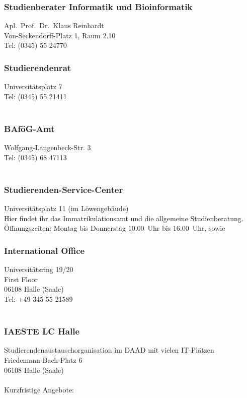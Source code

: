 \subsubsection{Studienberater Informatik und Bioinformatik}
Apl.\ Prof.\ Dr.\ Klaus Reinhardt\\
Von-Seckendorff-Platz 1, Raum 2.10\\
Tel: (0345) 55 24770\\

\subsubsection{Studierendenrat}
Universitätsplatz 7\\
Tel: (0345) 55 21411\\
 \\

\subsubsection{BAföG-Amt}
Wolfgang-Langenbeck-Str. 3\\
Tel: (0345) 68 47113\\
\\

\subsubsection{Studierenden-Service-Center}
Universitätsplatz 11 (im Löwengebäude)\\
Hier findet ihr das Immatrikulationsamt und die allgemeine
Studienberatung.\\
Öffnungszeiten: Montag bis Donnerstag 10.00~Uhr bis 16.00~Uhr, sowie \\

\subsubsection{International Office}
Universitätsring 19/20 \\
First Floor \\
06108 Halle (Saale) \\
Tel: +49 345 55 21589\\
\\

\subsubsection{IAESTE LC Halle}
Studierendenaustauschorganisation im DAAD mit vielen IT-Plätzen \\
Friedemann-Bach-Platz 6 \\
06108 Halle (Saale) \\
 \\
Kurzfristige Angebote: 

